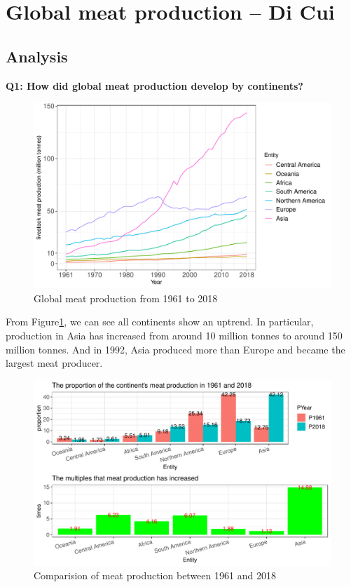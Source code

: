 \documentclass[11pt,a4paper,]{article}
\begin{document}
\section*{Global meat production -- Di Cui}

\subsection*{Analysis}

\textbf{Q1: How did global meat production develop by continents?}

\begin{figure}
\centering
\includegraphics{report_files/figure-latex/continent-figure-1.pdf}
\caption{\label{fig:continent-figure}Global meat production from 1961 to 2018}
\end{figure}

From Figure\ref{fig:continent-figure}, we can see all continents show an uptrend. In particular, production in Asia has increased from around 10 million tonnes to around 150 million tonnes. And in 1992, Asia produced more than Europe and became the largest meat producer.

\clearpage

\begin{figure}
\centering
\includegraphics{report_files/figure-latex/continent-increase-1.pdf}
\caption{\label{fig:continent-increase}Comparision of meat production between 1961 and 2018}
\end{figure}
\end{document}

